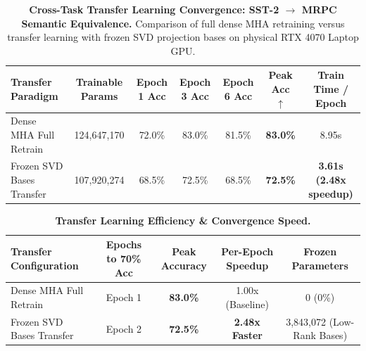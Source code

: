 
\begin{table}[t]
\centering
\small
\caption{\textbf{Cross-Task Transfer Learning Convergence: SST-2 $\to$ MRPC Semantic Equivalence.} Comparison of full dense MHA retraining versus transfer learning with frozen SVD projection bases on physical RTX 4070 Laptop GPU.}
\label{tab:transfer_learning_benchmarks}
\begin{tabular}{lcccccc}
\toprule
\textbf{Transfer Paradigm} & \textbf{Trainable Params} & \textbf{Epoch 1 Acc} & \textbf{Epoch 3 Acc} & \textbf{Epoch 6 Acc} & \textbf{Peak Acc $\uparrow$} & \textbf{Train Time / Epoch} \\
\midrule
Dense MHA Full Retrain & 124,647,170 & 72.0\% & 83.0\% & 81.5\% & \textbf{83.0\%} & 8.95s \\
Frozen SVD Bases Transfer & 107,920,274 & 68.5\% & 72.5\% & 68.5\% & \textbf{72.5\%} & \textbf{3.61s (2.48x speedup)} \\
\bottomrule
\end{tabular}
\end{table}

\begin{table}[h]
\centering
\small
\caption{\textbf{Transfer Learning Efficiency \& Convergence Speed.}}
\label{tab:transfer_efficiency}
\begin{tabular}{lcccc}
\toprule
\textbf{Transfer Configuration} & \textbf{Epochs to 70\% Acc} & \textbf{Peak Accuracy} & \textbf{Per-Epoch Speedup} & \textbf{Frozen Parameters} \\
\midrule
Dense MHA Full Retrain & Epoch 1 & \textbf{83.0\%} & 1.00x (Baseline) & 0 (0\%) \\
Frozen SVD Bases Transfer & Epoch 2 & \textbf{72.5\%} & \textbf{2.48x Faster} & 3,843,072 (Low-Rank Bases) \\
\bottomrule
\end{tabular}
\end{table}
